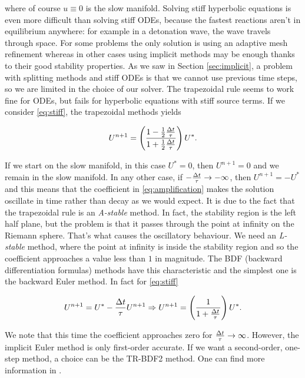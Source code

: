 \documentclass[journal,onecolumn]{IEEEtran}
\begin{document}
where of course $u\equiv0$ is the slow manifold. Solving stiff hyperbolic equations is even more difficult than solving stiff ODEs, because the fastest reactions aren't in equilibrium anywhere: for example in a detonation wave, the wave travels through space. For some problems the only solution is using an adaptive mesh refinement whereas in other cases using implicit methods may be enough thanks to their good stability properties. As we saw in Section \ref{sec:implicit}, a problem with splitting methods and stiff ODEs is that we cannot use previous time steps, so we are limited in the choice of our solver. The trapezoidal rule seems to work fine for ODEs, but fails for hyperbolic equations with stiff source terms. If we consider \eqref{eq:stiff}, the trapezoidal methods yields

\begin{equation}\label{eq:amplification}
	U^{n+1} = \left(\frac{1-\frac{1}{2}\frac{\Delta t}{\tau}}{1+\frac{1}{2}\frac{\Delta t}{\tau}}\right)U^*.
\end{equation}

If we start on the slow manifold, in this case $U^*=0$, then $U^{n+1}=0$ and we remain in the slow manifold. In any other case, if $-\frac{\Delta t}{\tau}\rightarrow-\infty$, then $U^{n+1}=-U^*$ and this means that the coefficient in \eqref{eq:amplification} makes the solution oscillate in time rather than decay as we would expect. It is due to the fact that the trapezoidal rule is an \textit{A-stable} method. In fact, the stability region is the left half plane, but the problem is that it passes through the point at infinity on the Riemann sphere. That's what causes the oscillatory behaviour. We need an \textit{L-stable} method, where the point at infinity is inside the stability region and so the coefficient approaches a value less than $1$ in magnitude. The BDF (backward differentiation formulas) methods have this characteristic and the simplest one is the backward Euler method. In fact for \eqref{eq:stiff}

\begin{equation}
	U^{n+1}=U^*-\frac{\Delta t}{\tau}U^{n+1}\Rightarrow U^{n+1} = \left(\frac{1}{1+\frac{\Delta t}{\tau}}\right)U^*.
\end{equation}

We note that this time the coefficient approaches zero for $\frac{\Delta t }{\tau}\rightarrow\infty$. However, the implicit Euler method is only first-order accurate. If we want a second-order, one-step method, a choice can be the TR-BDF2 method. One can find more information in \cite{leveque}.
\end{document}
